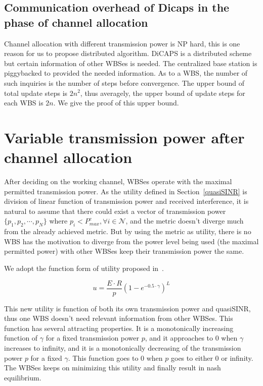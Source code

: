 \subsection{Communication overhead of Dicaps in the phase of channel allocation}

Channel allocation with different transmission power is NP hard, this is one reason for us to propose distributed algorithm.
DiCAPS is a distributed scheme but certain information of other WBSes is needed.
The centralized base station is piggybacked to provided the needed information.
As to a WBS, the number of such inquiries is the number of steps before convergence.
The upper bound of total update steps is $2n^2$, thus averagely, the upper bound of update steps for each WBS is $2n$.
We give the proof of this upper bound. 


\section{Variable transmission power after channel allocation}
\label{powerAllocation}
After deciding on the working channel, WBSes operate with the maximal permitted transmission power.
As the utility defined in Section~\ref{quasiSINR} is division of linear function of transmission power and received interference, it is natural to assume that there could exist a vector of transmission power $\{p_1, p_2, \cdots, p_N\}$ where $p_i<P_{max}^c,\forall i\in \mathcal{N}$, and the metric doesn't diverge much from the already achieved metric.
But by using the metric as utility, there is no WBS has the motivation to diverge from the power level being used (the maximal permitted power) with other WBSes keep their transmission power the same.

We adopt the function form of utility proposed in~\cite{power_control_utility_98}.

\[u= \dfrac{E\cdot R}{p}(1-e^{-0.5\cdot \gamma})^L\]

This new utility is function of both its own transmission power and quasiSINR, thus one WBS doesn't need relevant information from other WBSes. 
This function has several attracting properties.
It is a monotonically increasing function of $\gamma$ for a fixed transmission power $p$, and it approaches to 0 when $\gamma$ increases to infinity, and it is a monotonically decreasing of the transmission power $p$ for a fixed $\gamma$.
This function goes to 0 when $p$ goes to either 0 or infinity.
The WBSes keeps on minimizing this utility and finally result in nash equilibrium.
 


